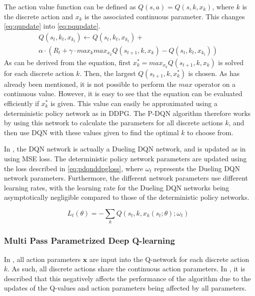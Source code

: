 \documentclass{kththesis}
\begin{document}
The action value function can be defined as $Q(s, a) = Q(s, k, x_k)$, where $k$ is the discrete action and $x_k$ is the associated continuous parameter. This changes \autoref{eq:qupdate} into \autoref{eq:pqupdate}. 
\begin{equation}
\label{eq:pqupdate}
\begin{split}
Q(s_t, k_t, x_{k_t}) \leftarrow Q(s_t, k_t, x_{k_t}) + \\ \alpha \cdot (R_t + \gamma \cdot max_k max_{x_k} Q(s_{t+1}, k, x_k) - Q(s_t, k_t, x_{k_t}))
\end{split}
\end{equation}
As can be derived from the equation, first $x_k^* = max_{x_k}Q(s_{t+1}, k, x_k)$ is solved for each discrete action $k$. Then, the largest $Q(s_{t+1}, k, x_k^*)$ is chosen. As has already been mentioned, it is not possible to perform the $max$ operator on a continuous value. However, it is easy to see that the equation can be evaluated efficiently if $x_k^*$ is given. This value can easily be approximated using a deterministic policy network as in DDPG. The P-DQN algorithm therefore works by using this network to calculate the parameters for all discrete actions $k$, and then use DQN with these values given to find the optimal $k$ to choose from. \parencite{xiong2018parametrized}

In \textcite{xiong2018parametrized}, the DQN network is actually a Dueling DQN network, and is updated as in \textcite{mnih2015human} using MSE loss. The deterministic policy network parameters are updated using the loss described in \autoref{eq:pdqnddpgloss}, where $\omega_t$ represents the Dueling DQN network parameters. Furthermore, the different network parameters use different learning rates, with the learning rate for the Dueling DQN networks being asymptotically negligible compared to those of the deterministic policy networks. 

\begin{equation}
\label{eq:pdqnddpgloss}
L_t(\theta) = -\sum_kQ(s_t, k, x_k(s_t;\theta);\omega_t)
\end{equation}

\subsubsection{Multi Pass Parametrized Deep Q-learning}
In \textcite{xiong2018parametrized}, all action parameters $\boldsymbol{x}$ are input into the Q-network for each discrete action $k$. As such, all discrete actions share the continuous action parameters. In \textcite{bester2019mpdqn}, it is described that this negatively affects the performance of the algorithm due to the updates of the Q-values and action parameters being affected by all parameters. 
\end{document}
